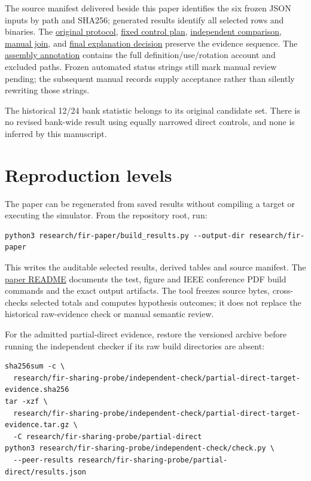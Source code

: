 \documentclass[conference]{IEEEtran}
\begin{document}
The source manifest delivered beside this paper identifies the six
frozen JSON inputs by path and SHA256; generated results identify all
selected rows and binaries. The
\href{../fir-sharing-probe/PROTOCOL.md}{original protocol},
\href{../../docs/superpowers/plans/2026-10-20-fir-baseline-check.md}{fixed
control plan},
\href{../fir-sharing-probe/independent-check/comparison.md}{independent
comparison},
\href{../fir-sharing-probe/independent-check/join-review.md}{manual
join}, and
\href{../fir-sharing-probe/explanation-check/final-decision.md}{final
explanation decision} preserve the evidence sequence. The
\href{../fir-sharing-probe/compiler-explanation/assembly-notes.md}{assembly
annotation} contains the full definition/use/rotation account and
excluded paths. Frozen automated status strings still mark manual review
pending; the subsequent manual records supply acceptance rather than
silently rewriting those strings.

The historical 12/24 bank statistic belongs to its original candidate
set. There is no revised bank-wide result using equally narrowed direct
controls, and none is inferred by this manuscript.

\section{Reproduction levels}\label{appendix-c.-reproduction-levels}

The paper can be regenerated from saved results without compiling a
target or executing the simulator. From the repository root, run:

\begin{Verbatim}[breaklines,breakanywhere,breaksymbolleft={},breaksymbolright={},fontsize=\scriptsize]
python3 research/fir-paper/build_results.py --output-dir research/fir-paper
\end{Verbatim}

This writes the auditable selected results, derived tables and source
manifest. The \href{README.md}{paper README} documents the test, figure
and IEEE conference PDF build commands and the exact output artifacts.
The tool freezes source bytes, cross-checks selected totals and computes
hypothesis outcomes; it does not replace the historical raw-evidence
check or manual semantic review.

For the admitted partial-direct evidence, restore the versioned archive
before running the independent checker if its raw build directories are
absent:

\begin{Verbatim}[breaklines,breakanywhere,breaksymbolleft={},breaksymbolright={},fontsize=\scriptsize]
sha256sum -c \
  research/fir-sharing-probe/independent-check/partial-direct-target-evidence.sha256
tar -xzf \
  research/fir-sharing-probe/independent-check/partial-direct-target-evidence.tar.gz \
  -C research/fir-sharing-probe/partial-direct
python3 research/fir-sharing-probe/independent-check/check.py \
  --peer-results research/fir-sharing-probe/partial-direct/results.json
\end{Verbatim}
\end{document}
